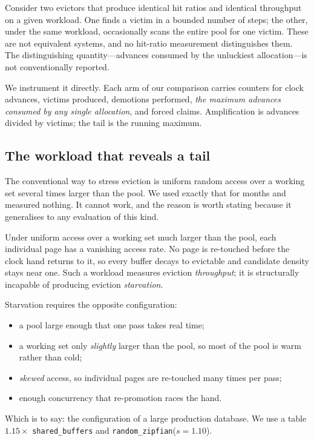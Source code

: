 \documentclass[sigconf,nonacm]{acmart}
\begin{document}
Consider two evictors that produce identical hit ratios and identical
throughput on a given workload. One finds a victim in a bounded number of
steps; the other, under the same workload, occasionally scans the entire pool
for one victim. These are not equivalent systems, and no hit-ratio measurement
distinguishes them. The distinguishing quantity---advances consumed by the
unluckiest allocation---is not conventionally reported.

We instrument it directly. Each arm of our comparison carries counters for
clock advances, victims produced, demotions performed, \emph{the maximum
advances consumed by any single allocation}, and forced claims. Amplification
is advances divided by victims; the tail is the running maximum.

\subsection{The workload that reveals a tail}

The conventional way to stress eviction is uniform random access over a working
set several times larger than the pool. We used exactly that for months and
measured nothing. It cannot work, and the reason is worth stating because it
generalises to any evaluation of this kind.

Under uniform access over a working set much larger than the pool, each
individual page has a vanishing access rate. No page is re-touched before the
clock hand returns to it, so every buffer decays to evictable and candidate
density stays near one. Such a workload measures eviction \emph{throughput};
it is structurally incapable of producing eviction \emph{starvation}.

Starvation requires the opposite configuration:

\begin{itemize}
\item a pool large enough that one pass takes real time;
\item a working set only \emph{slightly} larger than the pool, so most of the
  pool is warm rather than cold;
\item \emph{skewed} access, so individual pages are re-touched many times per
  pass;
\item enough concurrency that re-promotion races the hand.
\end{itemize}

Which is to say: the configuration of a large production database. We use a
table $1.15\times$ \texttt{shared\_buffers} and
\texttt{random\_zipfian}($s{=}1.10$).
\end{document}
